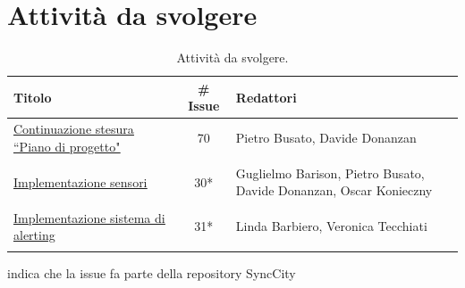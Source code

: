\documentclass[8pt]{article}
\begin{document}
\section{Attività da svolgere}
\begin{table}[ht!]
	\centering
	\begin{tabular}{p{7cm}cp{7cm}}
		\toprule
		\textbf{Titolo} & \textbf{\# Issue} & \textbf{Redattori} \\
		\midrule
		\href{https://github.com/NaN1fy/docs/issues/70}{\underline{Continuazione stesura
      ``Piano di progetto"}} & 70 & Pietro Busato, Davide Donanzan \\\\
		\href{https://github.com/NaN1fy/SyncCity/issues/30}{\underline{Implementazione sensori}} &
      30*\tnote{*} & Guglielmo Barison, Pietro Busato, Davide Donanzan, Oscar Konieczny \\\\
		\href{https://github.com/NaN1fy/SyncCity/issues/31}{\underline{Implementazione sistema di
      alerting}} & 31*\tnote{*} & Linda Barbiero, Veronica Tecchiati\\\\
		\bottomrule
	\end{tabular}
	\begin{tablenotes}
		\vspace{1em}
		\item * indica che la issue fa parte della repository SyncCity
	\end{tablenotes}
	\caption{Attività da svolgere.}
	\label{table:Attivita da svolgere}
\end{table}
\end{document}
